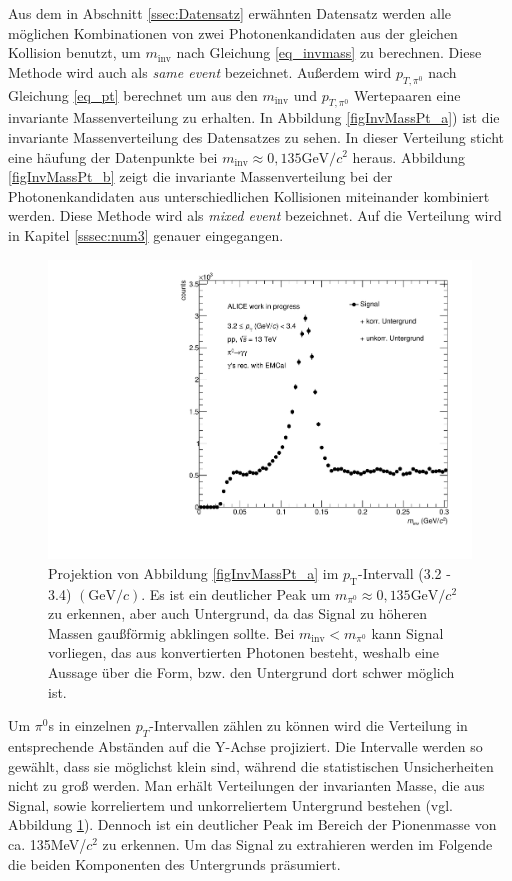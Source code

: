 \documentclass[11pt]{article}
\begin{document}
Aus dem in Abschnitt \ref{ssec:Datensatz} erw{\"a}hnten Datensatz werden alle m{\"o}glichen Kombinationen von zwei Photonenkandidaten aus der gleichen Kollision benutzt, um $m_{\text{inv}}$ nach Gleichung \ref{eq_invmass} zu berechnen. Diese Methode wird auch als {\it same event} bezeichnet. Au{\ss}erdem wird $p_{T,\pi^{0}}$ nach Gleichung \ref{eq_pt} berechnet um aus den $m_{\text{inv}}$ und $p_{T,\pi^{0}}$ Wertepaaren eine invariante Massenverteilung zu erhalten. In Abbildung \ref{figInvMassPt_a}) ist die invariante Massenverteilung des Datensatzes zu sehen. In dieser Verteilung sticht eine h{\"a}ufung der Datenpunkte bei $m_{\text{inv}}\approx 0,135\text{GeV/}c^{2}$ heraus. Abbildung \ref{figInvMassPt_b} zeigt die invariante Massenverteilung bei der Photonenkandidaten aus unterschiedlichen Kollisionen miteinander kombiniert werden. Diese Methode wird als {\it mixed event} bezeichnet. Auf die Verteilung wird in Kapitel \ref{sssec:num3} genauer eingegangen.

	\begin{figure}[tbp]
		\centering
		\includegraphics[width=.7\linewidth]{hSignalPlusBkg.pdf}
		\caption{Projektion von Abbildung \ref{figInvMassPt_a} im $p_{\text{T}}$-Intervall (3.2 - 3.4) $(\text{GeV/}c)$. Es ist ein deutlicher Peak um $m_{\pi^{0}} \approx 0,135\text{GeV/}c^{2}$ zu erkennen, aber auch Untergrund, da das Signal zu h{\"o}heren Massen gau{\ss}f{\"o}rmig abklingen sollte. Bei $m_{\text{inv}} < m_{\pi^{0}}$ kann Signal vorliegen, das aus konvertierten Photonen besteht, weshalb eine Aussage {\"u}ber die Form, bzw. den Untergrund dort schwer m{\"o}glich ist.}
		\label{figSignalPlusBkg}
	\end{figure}

	Um $\pi^{0}$s in einzelnen $p_{T}$-Intervallen z{\"a}hlen zu k{\"o}nnen wird die Verteilung in entsprechende Abst{\"a}nden auf die Y-Achse projiziert. Die Intervalle werden so gew{\"a}hlt, dass sie m{\"o}glichst klein sind, w{\"a}hrend die statistischen Unsicherheiten nicht zu gro{\ss} werden. Man erh{\"a}lt Verteilungen der invarianten Masse, die aus Signal, sowie korreliertem und unkorreliertem Untergrund bestehen (vgl. Abbildung \ref{figSignalPlusBkg}). Dennoch ist ein deutlicher Peak im Bereich der Pionenmasse von ca. 135MeV/$c^{2}$ zu erkennen. Um das Signal zu extrahieren werden im Folgende die beiden Komponenten des Untergrunds pr{\"a}sumiert.
\end{document}
